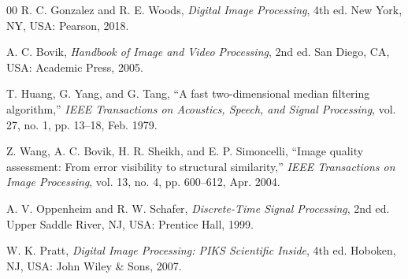 \documentclass[conference,a4paper]{IEEEtran}
\begin{document}
\begin{thebibliography}{00}
	R. C. Gonzalez and R. E. Woods, \textit{Digital Image Processing}, 4th ed. New York, NY, USA: Pearson, 2018.

	A. C. Bovik, \textit{Handbook of Image and Video Processing}, 2nd ed. San Diego, CA, USA: Academic Press, 2005.

	T. Huang, G. Yang, and G. Tang, ``A fast two-dimensional median filtering algorithm,'' \textit{IEEE Transactions on Acoustics, Speech, and Signal Processing}, vol. 27, no. 1, pp. 13--18, Feb. 1979.

	Z. Wang, A. C. Bovik, H. R. Sheikh, and E. P. Simoncelli, ``Image quality assessment: From error visibility to structural similarity,'' \textit{IEEE Transactions on Image Processing}, vol. 13, no. 4, pp. 600--612, Apr. 2004.

	A. V. Oppenheim and R. W. Schafer, \textit{Discrete-Time Signal Processing}, 2nd ed. Upper Saddle River, NJ, USA: Prentice Hall, 1999.

	W. K. Pratt, \textit{Digital Image Processing: PIKS Scientific Inside}, 4th ed. Hoboken, NJ, USA: John Wiley \& Sons, 2007.
\end{thebibliography}
\end{document}
